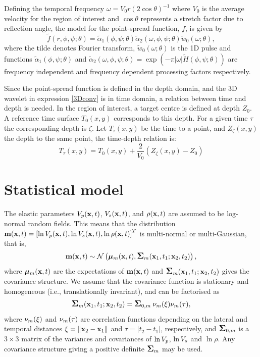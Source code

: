 Defining the temporal frequency $\omega = V_0r(2\cos{\theta})^{-1}$
where $V_0$ is the average velocity for the region of interest and
$\cos{\theta}$ represents a stretch factor due to reflection angle,
the model for the point-spread function, $f$, is given by
\begin{equation}
  \tilde{f}(r,\phi,\psi;\theta) 
  = \tilde{\alpha}_1(\phi,\psi;\theta)
    \tilde{\alpha}_2(\omega,\phi,\psi;\theta)
    \tilde{w}_0\left(\omega;\theta\right), \label{eq:waveletform}
\end{equation}
where the tilde denotes Fourier transform,
$\tilde{w}_0(\omega;\theta)$ is the 1D pulse and functions
$\tilde{\alpha}_1(\phi,\psi;\theta)$ and
$\tilde{\alpha}_2(\omega,\phi,\psi;\theta) = \exp(-\pi |\omega|
\tilde{H}(\phi,\psi;\theta))$ are frequency independent and frequency
dependent processing factors respectively.

Since the point-spread function is defined in the depth domain, and the 3D wavelet in expression \eqref{3Dconv} is in time domain, a relation between time and depth is needed. In the region of interest, a target centre is defined at depth $Z_0$. A reference time surface $T_0(x,y)$ corresponds to this depth. For a given time $\tau$ the corresponding depth is $\zeta$. Let $T_{\tau}(x,y)$ be the time to a point, and $Z_{\zeta}(x,y)$ the depth to the same point, the time-depth relation is:
\begin{equation}
T_{\tau}(x,y) = T_0(x,y) + \frac{2}{V_0}(Z_{\zeta}(x,y)-Z_0)
\end{equation}



\section{Statistical model}
\label{sec:statmodthe}
The elastic parameters $V_p(\mathbf{x},t)$, $V_s(\mathbf{x},t)$, and
$\rho(\mathbf{x},t)$ are assumed to be log-normal random
fields. This means that the distribution $\mathbf{m}(\mathbf{x},t) =
\left[\ln V_p(\mathbf{x},t),\ln V_s(\mathbf{x},t),\ln\rho(\mathbf{x},t)\right]^T$
is multi-normal or multi-Gaussian, that is,
%
\begin{equation}
  \mathbf{m}(\mathbf{x},t) \sim
  \mathcal{N}\left(\bm\mu_m(\mathbf{x},t),\mbox{\large\ensuremath{\boldsymbol{\Sigma}}}_m(\mathbf{x}_1,t_1;\mathbf{x}_2,t_2)\right),
\label{mdist}
\end{equation}
%
where $\bm\mu_m(\mathbf{x},t)$ are the expectations of
$\mathbf{m}(\mathbf{x},t)$ and $\mbox{\large\ensuremath{\boldsymbol{\Sigma}}}_m(\mathbf{x}_1,t_1;\mathbf{x}_2,t_2)$
gives the covariance structure. We assume that the covariance function
is stationary and homogeneous (i.e., translationally invariant), and
can be factorised as
%
\begin{equation}
  \mbox{\large\ensuremath{\boldsymbol{\Sigma}}}_m(\mathbf{x}_1,t_1;\mathbf{x}_2,t_2)
    = \mbox{\large\ensuremath{\boldsymbol{\Sigma}}}_{0,m} \: \nu_m(\xi) \nu_m(\tau), \label{sigma_m}
\end{equation}
%
where $\nu_m(\xi)$ and $\nu_m(\tau)$ are correlation functions
depending on the lateral and temporal distances
$\xi = \|\mathbf{x}_2 - \mathbf{x}_1\|$ and $\tau=|t_2-t_1|$,
respectively, and $\mbox{\large\ensuremath{\boldsymbol{\Sigma}}}_{0,m}$ is a $3\times 3$ matrix of the
variances and covariances of $\ln V_p$, $\ln V_s$ and $\ln\rho$. Any
covariance structure giving a positive definite $\mbox{\large\ensuremath{\boldsymbol{\Sigma}}}_m$ may be
used. 

